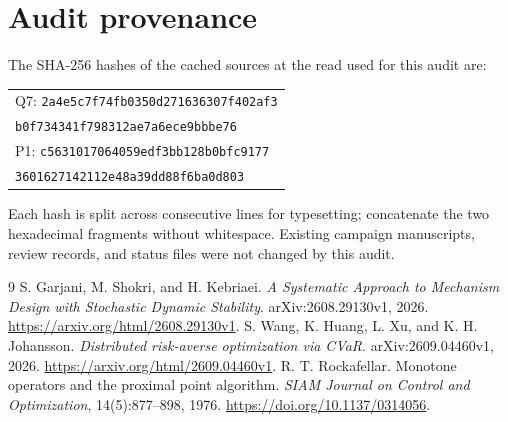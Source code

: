 \documentclass[11pt,a4paper]{article}
\begin{document}
\appendix
\section{Audit provenance}
The SHA-256 hashes of the cached sources at the read used for this audit are:
\begin{center}\small
\begin{tabular}{l}
Q7: \texttt{2a4e5c7f74fb0350d271636307f402af3}\\
\phantom{Q7: }\texttt{b0f734341f798312ae7a6ece9bbbe76}\\[3pt]
P1: \texttt{c5631017064059edf3bb128b0bfc9177}\\
\phantom{P1: }\texttt{3601627142112e48a39dd88f6ba0d803}
\end{tabular}
\end{center}
Each hash is split across consecutive lines for typesetting; concatenate
the two hexadecimal fragments without whitespace. Existing campaign
manuscripts, review records, and status files were not changed by this audit.

\begin{thebibliography}{9}
S. Garjani, M. Shokri, and H. Kebriaei.
\emph{A Systematic Approach to Mechanism Design with Stochastic Dynamic Stability}.
arXiv:2608.29130v1, 2026.
\url{https://arxiv.org/html/2608.29130v1}.
S. Wang, K. Huang, L. Xu, and K. H. Johansson.
\emph{Distributed risk-averse optimization via CVaR}.
arXiv:2609.04460v1, 2026.
\url{https://arxiv.org/html/2609.04460v1}.
R. T. Rockafellar.
Monotone operators and the proximal point algorithm.
\emph{SIAM Journal on Control and Optimization}, 14(5):877--898, 1976.
\url{https://doi.org/10.1137/0314056}.
\end{thebibliography}
\end{document}
